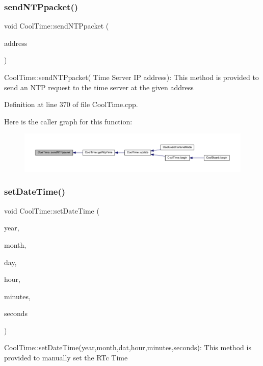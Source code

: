 \subsubsection{\texorpdfstring{send\+N\+T\+Ppacket()}{sendNTPpacket()}}
{\footnotesize\ttfamily void Cool\+Time\+::send\+N\+T\+Ppacket (\begin{DoxyParamCaption}\item[{I\+P\+Address \&}]{address }\end{DoxyParamCaption})}

Cool\+Time\+::send\+N\+T\+Ppacket( Time Server I\+P address)\+: This method is provided to send an N\+TP request to the time server at the given address 

Definition at line 370 of file Cool\+Time.\+cpp.

Here is the caller graph for this function\+:\nopagebreak
\begin{figure}[H]
\begin{center}
\leavevmode
\includegraphics[width=350pt]{class_cool_time_a236a38d120dc53bc67456d763838c5a1_icgraph}
\end{center}
\end{figure}
\mbox{\label{class_cool_time_ab81ea7fdaace111aa01cc1ec84c6d297}} 
\subsubsection{\texorpdfstring{set\+Date\+Time()}{setDateTime()}}
{\footnotesize\ttfamily void Cool\+Time\+::set\+Date\+Time (\begin{DoxyParamCaption}\item[{int}]{year,  }\item[{int}]{month,  }\item[{int}]{day,  }\item[{int}]{hour,  }\item[{int}]{minutes,  }\item[{int}]{seconds }\end{DoxyParamCaption})}

Cool\+Time\+::set\+Date\+Time(year,month,dat,hour,minutes,seconds)\+: This method is provided to manually set the R\+Tc Time 

